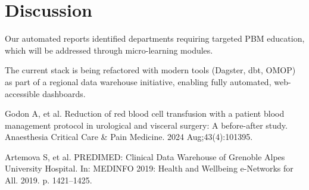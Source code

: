 \documentclass{IOS-Book-Article}
\begin{document}
\section{Discussion}

Our automated reports identified departments requiring targeted PBM education, 
which will be addressed through micro-learning modules.

The current stack is being refactored with modern tools (Dagster, dbt, OMOP) 
as part of a regional data warehouse initiative, enabling 
fully automated, web-accessible dashboards.

\begin{thebibliography}{99}

Godon A, et al. Reduction of red blood cell transfusion with a patient blood management protocol in urological and visceral surgery: A before-after study. Anaesthesia Critical Care \& Pain Medicine. 2024 Aug;43(4):101395.

Artemova S, et al. PREDIMED: Clinical Data Warehouse of Grenoble Alpes University Hospital. In: MEDINFO 2019: Health and Wellbeing e-Networks for All. 2019. p. 1421--1425.

\end{thebibliography}
\end{document}
